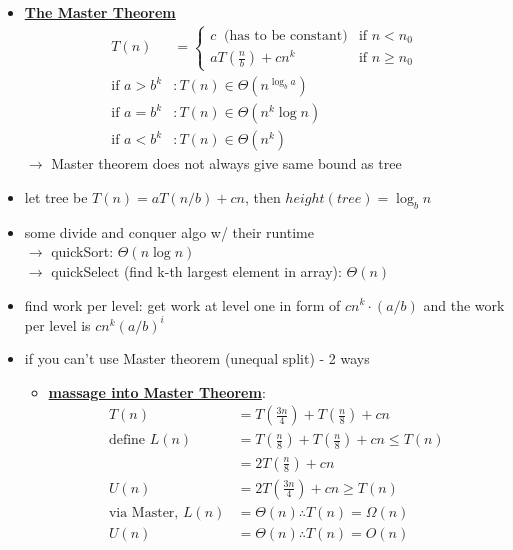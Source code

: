 \begin{itemize}
    \item \ul{\textbf{The Master Theorem}}
    {\color{Violet}
    \begin{align*}
        T(n) &= 
        \begin{cases}
            c~ \text{ (has to be constant)} &\text{if } n < n_0 \\
            aT\left(\frac{n}{b} \right) + cn^k &\text{if } n \geq n_0
        \end{cases} \\
        \text{if } a > b^k &: T(n) \in \Theta(n ^{\log_b a}) \\
        \text{if } a = b^k &: T(n) \in \Theta(n^k \log n) \\
        \text{if } a < b^k &: T(n) \in \Theta(n^k)
    \end{align*}
    }
    $\rightarrow$ Master theorem does not always give same bound as tree
    \item let tree be $T(n) = a T(n/b) + cn$, then $height(tree) = \log_b n$
    \item some divide and conquer algo w/ their runtime\\
    $\longrightarrow$ quickSort: $\Theta(n\log n )$\\
    $\longrightarrow$ quickSelect (find k-th largest element in array): $\Theta(n)$
    \item find work per level: get work at level one in form of $cn^k \cdot (a/b)$ and the work per level is $cn^k(a/b)^i$
    \item if you can't use Master theorem (unequal split) - 2 ways 
    \begin{itemize}[leftmargin = 1em]
        \item \ul{\textbf{massage into Master Theorem}}: 
            \begin{align*}
                T(n) &= T\left( \frac{3n}{4} \right) + T \left(\frac{n}{8} \right) + cn \\
                \text{define } L(n) &= T \left(\frac{n}{8} \right) + T \left(\frac{n}{8} \right) + cn \leq T(n) \\
                &= 2T \left(\frac{n}{8} \right) + cn  \\
                U(n) &= 2 T \left(\frac{3n}{4} \right) +cn \geq T(n) \\ 
                \text{via Master, } L(n) &= \Theta(n) \therefore T(n) = \Omega(n) \\ 
                U(n) &= \Theta(n) \therefore T(n) = O(n) \\

\end{align*}
\end{itemize}
\end{itemize}
